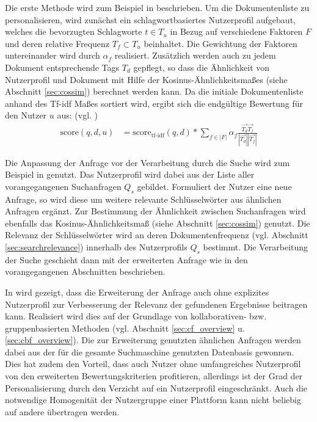 Die erste Methode wird zum Beispiel in \citep{Durao12} beschrieben. Um die Dokumentenliste zu personalisieren, wird zunächst ein schlagwortbasiertes Nutzerprofil aufgebaut, welches die bevorzugten Schlagworte $t \in T_u$ in Bezug auf verschiedene Faktoren $F$ und deren relative Frequenz $T_f \subset T_u$ beinhaltet. Die Gewichtung der Faktoren untereinander wird durch $\alpha_f$ realisiert. Zusätzlich werden auch zu jedem Dokument entsprechende Tags $T_d$ gepflegt, so dass die Ähnlichkeit von Nutzerprofil und Dokument mit Hilfe der Kosinus-Ähnlichkeitsmaßes (siehe Abschnitt \ref{sec:cossim}) berechnet werden kann. Da die initiale Dokumentenliste anhand des Tf-idf Maßes sortiert wird, ergibt sich die endgültige Bewertung für den Nutzer $u$ aus:  (vgl. \citep{Durao12})
\begin{align}
\text{score}(q,d,u) & = \text{score}_{\text{tf-idf}}(q,d) * \sum_{f \in |F|}{\alpha_f \frac{\overrightarrow{T_d} \overrightarrow{T_f}}{|\overrightarrow{T_d}| |\overrightarrow{T_f}|}} \label{form:personalresultstheorie}
\end{align}

Die Anpassung der Anfrage vor der Verarbeitung durch die Suche wird zum Beispiel in \citep{Boughareb11} genutzt. Das Nutzerprofil wird dabei aus der Liste aller vorangegangenen Suchanfragen $Q_s$ gebildet. Formuliert der Nutzer eine neue Anfrage, so wird diese um weitere relevante Schlüsselwörter aus ähnlichen Anfragen ergänzt. Zur Bestimmung der Ähnlichkeit zwischen Suchanfragen wird ebenfalls das Kosinus-Ähnlichkeitsmaß (siehe Abschnitt \ref{sec:cossim}) genutzt. Die Relevanz der Schlüsselwörter wird an deren Dokumentenfrequenz (vgl. Abschnitt \ref{sec:searchrelevance}) innerhalb des Nutzerprofils $Q_s$ bestimmt. Die Verarbeitung der Suche geschieht dann mit der erweiterten Anfrage wie in den vorangegangenen Abschnitten beschrieben.

In \citep{smyth05a} wird gezeigt, dass die Erweiterung der Anfrage auch ohne explizites Nutzerprofil zur Verbesserung der Relevanz der gefundenen Ergebnisse beitragen kann. Realisiert wird dies auf der Grundlage von kollaborativen- bzw. gruppenbasierten Methoden (vgl. Abschnitt \ref{sec:cf_overview} u. \ref{sec:cbf_overview}). Die zur Erweiterung genutzten ähnlichen Anfragen werden dabei aus der für die gesamte Suchmaschine genutzten Datenbasis gewonnen. Dies hat zudem den Vorteil, dass auch Nutzer ohne umfangreiches Nutzerprofil von den erweiterten Bewertungskriterien profitieren, allerdings ist der Grad der Personalisierung durch den Verzicht auf ein Nutzerprofil eingeschränkt. Auch die notwendige Homogenität der Nutzergruppe einer Plattform kann nicht beliebig auf andere übertragen werden. \citep{smyth05a}

